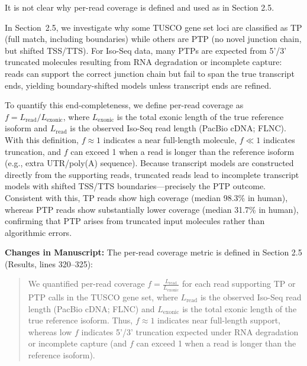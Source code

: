 \documentclass[11pt]{article}
\newcommand{\tuscoGeneSet}{TUSCO gene set}
\begin{document}
\begin{reviewercomment}
It is not clear why per-read coverage is defined and used as in Section 2.5.
\end{reviewercomment}

\begin{responseboxnew}
In Section~2.5, we investigate why some \tuscoGeneSet{} loci are classified as TP (full match, including boundaries) while others are PTP (no novel junction chain, but shifted TSS/TTS). For Iso-Seq data, many PTPs are expected from 5'/3' truncated molecules resulting from RNA degradation or incomplete capture: reads can support the correct junction chain but fail to span the true transcript ends, yielding boundary-shifted models unless transcript ends are refined.

To quantify this end-completeness, we define per-read coverage as $f = L_{\mathrm{read}}/L_{\mathrm{exonic}}$, where $L_{\mathrm{exonic}}$ is the total exonic length of the true reference isoform and $L_{\mathrm{read}}$ is the observed Iso-Seq read length (PacBio cDNA; FLNC). With this definition, $f \approx 1$ indicates a near full-length molecule, $f \ll 1$ indicates truncation, and $f$ can exceed 1 when a read is longer than the reference isoform (e.g., extra UTR/poly(A) sequence). Because transcript models are constructed directly from the supporting reads, truncated reads lead to incomplete transcript models with shifted TSS/TTS boundaries---precisely the PTP outcome. Consistent with this, TP reads show high coverage (median 98.3\% in human), whereas PTP reads show substantially lower coverage (median 31.7\% in human), confirming that PTP arises from truncated input molecules rather than algorithmic errors.

\vspace{0.3cm}
\textbf{Changes in Manuscript:} The per-read coverage metric is defined in Section 2.5 (Results, lines 320--325):
\begin{quote}
We quantified per-read coverage $f = \frac{L_{\mathrm{read}}}{L_{\mathrm{exonic}}}$ for each read supporting TP or PTP calls in the \tuscoGeneSet{}, where $L_{\mathrm{read}}$ is the observed Iso-Seq read length (PacBio cDNA; FLNC) and $L_{\mathrm{exonic}}$ is the total exonic length of the true reference isoform. Thus, $f \approx 1$ indicates near full-length support, whereas low $f$ indicates 5'/3' truncation expected under RNA degradation or incomplete capture (and $f$ can exceed 1 when a read is longer than the reference isoform).
\end{quote}
\end{responseboxnew}
\end{document}
